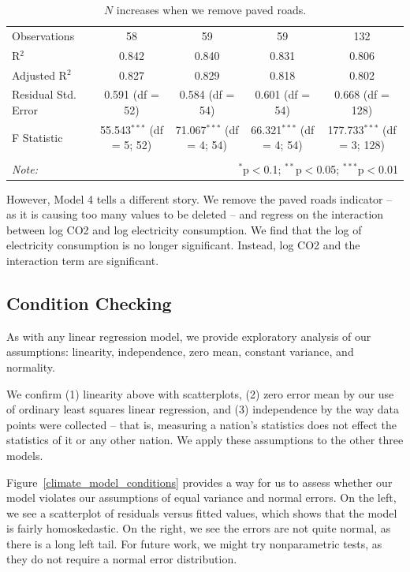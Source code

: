 \documentclass[11pt]{article}
\begin{document}
\begin{landscape}
\begin{table}[!htbp]
\begin{tabular}{@{\extracolsep{5pt}}lcccc}
Observations & 58 & 59 & 59 & 132 \\ 
R$^{2}$ & 0.842 & 0.840 & 0.831 & 0.806 \\ 
Adjusted R$^{2}$ & 0.827 & 0.829 & 0.818 & 0.802 \\ 
Residual Std. Error & 0.591 (df = 52) & 0.584 (df = 54) & 0.601 (df = 54) & 0.668 (df = 128) \\ 
F Statistic & 55.543$^{***}$ (df = 5; 52) & 71.067$^{***}$ (df = 4; 54) & 66.321$^{***}$ (df = 4; 54) & 177.733$^{***}$ (df = 3; 128) \\ 
\hline 
\hline \\[-1.8ex] 
\textit{Note:}  & \multicolumn{4}{r}{$^{*}$p$<$0.1; $^{**}$p$<$0.05; $^{***}$p$<$0.01} \\ 
\end{tabular} 
\caption{\label{climate_model_regressions}$N$ increases when we remove paved roads.}
\end{table} 
\end{landscape}
\restoregeometry
\doublespacing

However, Model 4 tells a different story.
We remove the paved roads indicator -- as it is causing too many values to be deleted -- and regress on the interaction between log CO2 and log electricity consumption.
We find that the log of electricity consumption is no longer significant.
Instead, log CO2 and the interaction term are significant.

\subsection{Condition Checking}
As with any linear regression model, we provide exploratory analysis of our assumptions: linearity, independence, zero mean, constant variance, and normality.

We confirm (1) linearity above with scatterplots, (2) zero error mean by our use of ordinary least squares linear regression, and (3) independence by the way data points were collected -- that is, measuring a nation's statistics does not effect the statistics of it or any other nation. We apply these assumptions to the other three models.

Figure~\ref{climate_model_conditions} provides a way for us to assess whether our model violates our assumptions of equal variance and normal errors. On the left, we see a scatterplot of residuals versus fitted values, which shows that the model is fairly homoskedastic. On the right, we see the errors are not quite normal, as there is a long left tail. For future work, we might try nonparametric tests, as they do not require a normal error distribution.
\end{document}
